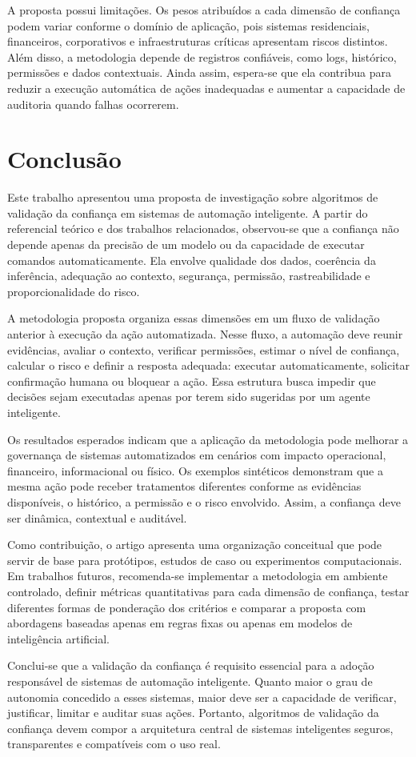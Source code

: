 \documentclass[12pt]{article}
\begin{document}
A proposta possui limitações. Os pesos atribuídos a cada dimensão de confiança podem variar conforme o domínio de aplicação, pois sistemas residenciais, financeiros, corporativos e infraestruturas críticas apresentam riscos distintos. Além disso, a metodologia depende de registros confiáveis, como logs, histórico, permissões e dados contextuais. Ainda assim, espera-se que ela contribua para reduzir a execução automática de ações inadequadas e aumentar a capacidade de auditoria quando falhas ocorrerem.

\section{Conclusão}

Este trabalho apresentou uma proposta de investigação sobre algoritmos de validação da confiança em sistemas de automação inteligente. A partir do referencial teórico e dos trabalhos relacionados, observou-se que a confiança não depende apenas da precisão de um modelo ou da capacidade de executar comandos automaticamente. Ela envolve qualidade dos dados, coerência da inferência, adequação ao contexto, segurança, permissão, rastreabilidade e proporcionalidade do risco.

A metodologia proposta organiza essas dimensões em um fluxo de validação anterior à execução da ação automatizada. Nesse fluxo, a automação deve reunir evidências, avaliar o contexto, verificar permissões, estimar o nível de confiança, calcular o risco e definir a resposta adequada: executar automaticamente, solicitar confirmação humana ou bloquear a ação. Essa estrutura busca impedir que decisões sejam executadas apenas por terem sido sugeridas por um agente inteligente.

Os resultados esperados indicam que a aplicação da metodologia pode melhorar a governança de sistemas automatizados em cenários com impacto operacional, financeiro, informacional ou físico. Os exemplos sintéticos demonstram que a mesma ação pode receber tratamentos diferentes conforme as evidências disponíveis, o histórico, a permissão e o risco envolvido. Assim, a confiança deve ser dinâmica, contextual e auditável.

Como contribuição, o artigo apresenta uma organização conceitual que pode servir de base para protótipos, estudos de caso ou experimentos computacionais. Em trabalhos futuros, recomenda-se implementar a metodologia em ambiente controlado, definir métricas quantitativas para cada dimensão de confiança, testar diferentes formas de ponderação dos critérios e comparar a proposta com abordagens baseadas apenas em regras fixas ou apenas em modelos de inteligência artificial.

Conclui-se que a validação da confiança é requisito essencial para a adoção responsável de sistemas de automação inteligente. Quanto maior o grau de autonomia concedido a esses sistemas, maior deve ser a capacidade de verificar, justificar, limitar e auditar suas ações. Portanto, algoritmos de validação da confiança devem compor a arquitetura central de sistemas inteligentes seguros, transparentes e compatíveis com o uso real.



\end{document}
